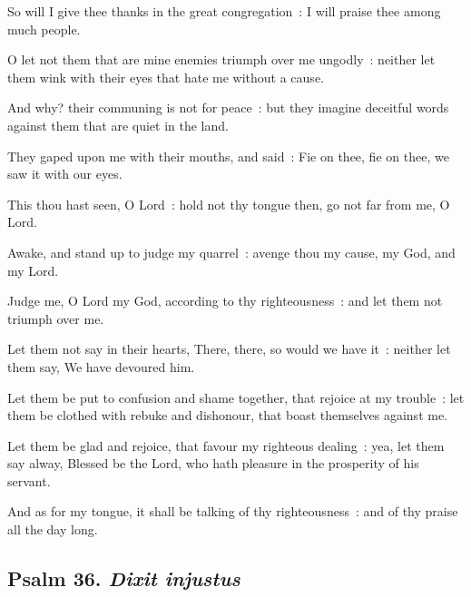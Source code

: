 So will I give thee thanks in the great congregation~: I will praise thee among much people.\par
{}O let not them that are mine enemies triumph over me ungodly~: neither let them wink with their eyes that hate me without a cause.\par
{}And why? their communing is not for peace~: but they imagine deceitful words against them that are quiet in the land.\par
{}They gaped upon me with their mouths, and said~: Fie on thee, fie on thee, we saw it with our eyes.\par
{}This thou hast seen, O Lord~: hold not thy tongue then, go not far from me, O Lord.\par
{}Awake, and stand up to judge my quarrel~: avenge thou my cause, my God, and my Lord.\par
{}Judge me, O Lord my God, according to thy righteousness~: and let them not triumph over me.\par
{}Let them not say in their hearts, There, there, so would we have it~: neither let them say, We have devoured him.\par
{}Let them be put to confusion and shame together, that rejoice at my trouble~: let them be clothed with rebuke and dishonour, that boast themselves against me.\par
{}Let them be glad and rejoice, that favour my righteous dealing~: yea, let them say alway, Blessed be the Lord, who hath pleasure in the prosperity of his servant.\par
{}And as for my tongue, it shall be talking of thy righteousness~: and of thy praise all the day long.\par

\subsection{Psalm 36. \textit{Dixit injustus}}


